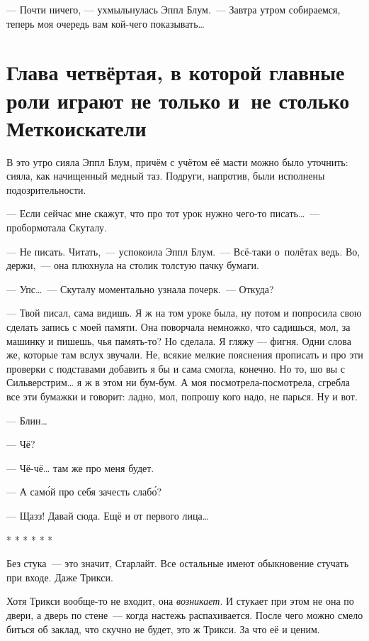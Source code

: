 \documentclass[fontsize=11pt,a5paper,titlepage=firstcover]{scrbook}
\begin{document}
--- Почти ничего, --- ухмыльнулась Эппл Блум.~--- Завтра утром собираемся, теперь моя очередь вам кой-чего показывать{\ldots}


\chapter*{Глава четвёртая, в которой главные роли играют не только и~не столько Меткоискатели}

В это утро сияла Эппл Блум, причём с учётом её масти можно было уточнить: сияла, как начищенный медный таз. Подруги, напротив, были исполнены подозрительности.

--- Если сейчас мне скажут, что про тот урок нужно чего-то писать{\ldots}~--- пробормотала Скуталу.

--- Не писать. Читать,~--- успокоила Эппл Блум.~--- Всё-таки о~полётах ведь. Во, держи,~--- она плюхнула на столик толстую пачку бумаги.

--- Упс{\ldots}~--- Скуталу моментально узнала почерк.~--- Откуда?

--- Твой писал, сама видишь. Я ж на том уроке была, ну потом и попросила свою сделать запись с моей памяти. Она поворчала немножко, что садишься, мол, за машинку и пишешь, чья память-то? Но сделала. Я гляжу --- фигня. Одни слова же, которые там вслух звучали. Не, всякие мелкие пояснения прописать и про эти проверки с подставами добавить я бы и сама смогла, конечно. Но то, шо вы с Сильверстрим{\ldots} я ж в этом ни бум-бум. А моя посмотрела-посмотрела, сгребла все эти бумажки и говорит: ладно, мол, попрошу кого надо, не парься. Ну и вот.

--- Блин{\ldots}

--- Чё?

--- Чё-чё{\ldots} там же про меня будет.

--- А само́й про себя зачесть слабо́?

--- Щазз! Давай сюда. Ещё и от первого лица{\ldots}
\begin{center}
	* * * * * *
\end{center}

Без стука~--- это значит, Старлайт. Все остальные имеют обыкновение стучать при входе. Даже Трикси.

Хотя Трикси вообще-то не входит, она \emph{возникает}. И стукает при этом не она по двери, а дверь по стене~--- когда настежь распахивается. После чего можно смело биться об заклад, что скучно не будет, это ж Трикси. За что её и ценим.
\end{document}
